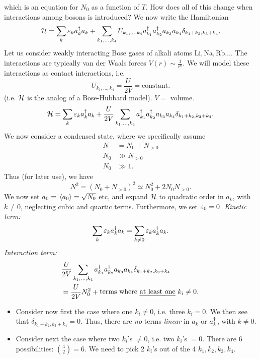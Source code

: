 which is an equation for $N_0$ as a function of $T$.
How does all of this change when interactions among bosons is introduced?
We now write the Hamiltonian 
\begin{equation}
	\mathcal{H} = \sum_{k}\varepsilon_k a_{k}^{\dagger}a_{k} + \sum_{k_1, \dots, k_4}U_{k_1, \dots, k_4}a_{k_1}^{\dagger}a_{k_2}^{\dagger}a_{k_3}a_{k_4} \delta_{k_1 +k_2, k_3 + k_4}.
\end{equation}
Let us consider weakly interacting Bose gases of alkali atoms $\mathrm{Li, Na, Rb}\dots$.
The interactions are typically van der Waals forces $V(r) \sim \frac{1}{r^6}$. We will model these interactions as contact interactions, i.e. 
\begin{equation}
	U_{k_1, \dots, k_4} = \frac{U}{2V} = \mathrm{constant}.
\end{equation}
(i.e. $\mathcal{H}$ is the analog of a Bose-Hubbard model). $V = $ volume. 
\begin{equation}
	\mathcal{H} = \sum_{k}\varepsilon_k a_{k}^{\dagger}a_{k} + \frac{U}{2V}\sum_{k_1, \dots, k_4}a_{k_1}^{\dagger}a_{k_2}^{\dagger}a_{k_3}a_{k_4} \delta_{k_1 +k_2, k_3 + k_4}.
\end{equation}
We now consider a condensed state, where we specifically assume
\begin{align}
	N &= N_0 + N_{>0} \\
	N_0 &\gg N_{>0} \\
	N_{0} &\gg 1.
\end{align}
Thus (for later use), we have
\begin{equation}
	\label{eq:Nsquared}
	N^2= (N_0 + N_{>0})^2 \simeq N_0^2 + 2N_0N_{>0}.
\end{equation}
We now set $a_0 = \ev*{a_0} = \sqrt{N_0}$ etc, and expand $\mathcal{H}$ to quadratic order in $a_k$, with $k\ne0$, neglecting cubic and quartic terms. Furthermore, we set $\varepsilon_0 = 0$. 
\emph{Kinetic term:}
\begin{equation}
	\sum_{k}\varepsilon_k a_{k}^{\dagger}a_{k} = \sum_{k\ne0}\varepsilon_k a_{k}^{\dagger}a_{k}.
\end{equation}
\emph{Interaction term:}
\begin{equation}
	\begin{aligned}
	&\frac{U}{2V}\sum_{k_1, \dots, k_4}a_{k_1}^{\dg}a_{k_2}^{\dg}a_{k_3}a_{k_4} \delta_{k_1 +k_2, k_3 + k_4} \\
	&= \frac{U}{2V}N_0^2 + \parbox{5cm}{terms where \emph{at least one} $k_i\ne0$.}
	\end{aligned}
\end{equation}
\begin{itemize}
	\item Consider now first the case where one $k_i\ne0$, i.e. three $k_i = 0$. We then see that $ \delta_{k_1 +k_2, k_3 + k_4} = 0 $.
	Thus, there are \emph{no} terms \emph{linear} in $a_k$ or $a_{k}^{\dagger}$, with $k\ne0$. 
	\item Consider next the case where two $k_i$'s $\ne0$, i.e. two $k_i$'s $=0$. 
	There are 6 possibilities: $\binom{4}{2} = 6$. We need to pick 2 $k_i$'s out of the 4 $k_1, k_2, k_3, k_4$. 
\end{itemize}
